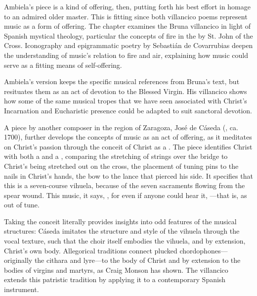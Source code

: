 \documentclass{vcbook-proposal}
\begin{document}
Ambiela's piece is a kind of offering, then, putting forth his best effort in 
homage to an admired older master.
This is fitting since both villancico poems represent music as a form of 
offering.
The chapter examines the Bruna villancico in light of Spanish mystical 
theology, particular the concepts of fire in the  by St. John of the Cross.
Iconography and epigrammatic poetry by Sebastián de Covarrubias deepen the
understanding of music's relation to fire and air, explaining how music could
serve as a fitting means of self-offering.

Ambiela's version keeps the specific musical references from Bruna's text, but 
resituates them as an act of devotion to the Blessed Virgin.
His villancico shows how some of the same musical tropes that we have seen 
associated with Christ's Incarnation and Eucharistic presence could be adapted 
to suit sanctoral devotion. 


A piece by another composer in the region of Zaragoza, José de Cáseda 
(, ca. 1700), further develops the concepts of 
music as an act of offering, as it meditates on Christ's passion through the 
conceit of Christ as a . 
The piece identifies Christ with both a  and a , 
comparing the stretching of strings over the bridge to Christ's being stretched 
out on the cross, the placement of tuning pins to the nails in Christ's hands, 
the bow to the lance that pierced his side.
It specifies that this is a seven-course vihuela, because of the seven 
sacraments flowing from the spear wound.
This music, it says, , for even if anyone could 
hear it, ---that is, as out of tune. 

Taking the conceit literally provides insights into odd features of the musical 
structures: Cáseda imitates the structure and style of the vihuela through the 
vocal texture, such that the choir itself embodies the vihuela, and by 
extension, Christ's own body.
Allegorical traditions connect plucked chordophones---originally the cithara 
and lyre---to the body of Christ and by extension to the bodies of virgins and 
martyrs, as Craig Monson has shown.%
  \Autocite{Monson:DivasConvent}
The villancico extends this patristic tradition by applying it to a 
contemporary Spanish instrument.
\end{document}
